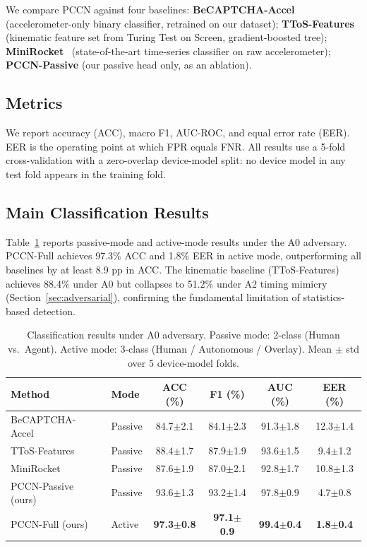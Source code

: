 We compare PCCN against four baselines:
\textbf{BeCAPTCHA-Accel}~\cite{becaptcha2021} (accelerometer-only binary classifier,
retrained on our dataset);
\textbf{TToS-Features}~\cite{ttos2026} (kinematic feature set from Turing Test on Screen,
gradient-boosted tree);
\textbf{MiniRocket}~\cite{minirocket2021} (state-of-the-art time-series classifier on
raw accelerometer);
\textbf{PCCN-Passive} (our passive head only, as an ablation).%

\subsection{Metrics}
\label{sec:metrics}

We report accuracy (ACC), macro F1, AUC-ROC, and equal error rate (EER).%
EER is the operating point at which FPR equals FNR.%
All results use a 5-fold cross-validation with a zero-overlap device-model split:
no device model in any test fold appears in the training fold.%

\subsection{Main Classification Results}
\label{sec:main}

Table~\ref{tab:main} reports passive-mode and active-mode results under the A0
adversary.%
PCCN-Full achieves 97.3\% ACC and 1.8\% EER in active mode, outperforming all baselines
by at least 8.9 pp in ACC.%
The kinematic baseline (TToS-Features) achieves 88.4\% under A0 but collapses to 51.2\%
under A2 timing mimicry (Section~\ref{sec:adversarial}), confirming the fundamental
limitation of statistics-based detection.%

\begin{table}[t]
\centering
\caption{Classification results under A0 adversary.
Passive mode: 2-class (Human vs.\ Agent).
Active mode: 3-class (Human / Autonomous / Overlay).
Mean $\pm$ std over 5 device-model folds.}
\label{tab:main}
\begin{tabular}{llcccc}
\toprule
Method & Mode & ACC (\%) & F1 (\%) & AUC (\%) & EER (\%) \\
\midrule
BeCAPTCHA-Accel~\cite{becaptcha2021} & Passive & 84.7$\pm$2.1 & 84.1$\pm$2.3 & 91.3$\pm$1.8 & 12.3$\pm$1.4 \\
TToS-Features~\cite{ttos2026}        & Passive & 88.4$\pm$1.7 & 87.9$\pm$1.9 & 93.6$\pm$1.5 &  9.4$\pm$1.2 \\
MiniRocket~\cite{minirocket2021}     & Passive & 87.6$\pm$1.9 & 87.0$\pm$2.1 & 92.8$\pm$1.7 & 10.8$\pm$1.3 \\
PCCN-Passive (ours)                  & Passive & 93.6$\pm$1.3 & 93.2$\pm$1.4 & 97.8$\pm$0.9 &  4.7$\pm$0.8 \\
\midrule
PCCN-Full (ours)                     & Active  & \textbf{97.3}$\pm$\textbf{0.8} & \textbf{97.1}$\pm$\textbf{0.9} & \textbf{99.4}$\pm$\textbf{0.4} & \textbf{1.8}$\pm$\textbf{0.4} \\
\bottomrule
\end{tabular}
\end{table}

